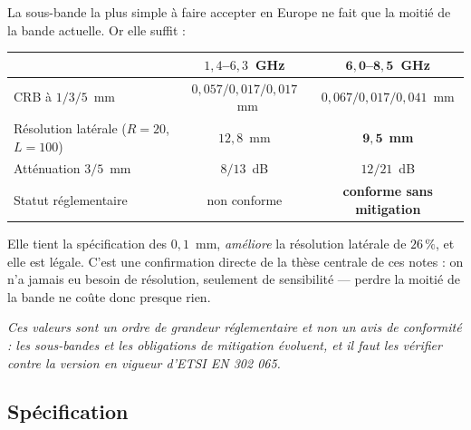 \documentclass[11pt,a4paper]{article}
\begin{document}
La sous-bande la plus simple à faire accepter en Europe ne fait que la moitié de
la bande actuelle. Or elle suffit :

\begin{table}[h]
\centering
\begin{tabular}{lcc}
\toprule
& $1{,}4$--$6{,}3$~GHz & $\mathbf{6{,}0}$--$\mathbf{8{,}5}$~\textbf{GHz} \\
\midrule
CRB à $1/3/5$~mm & $0{,}057 / 0{,}017 / 0{,}017$~mm
                 & $0{,}067 / 0{,}017 / 0{,}041$~mm \\
Résolution latérale ($R=20$, $L=100$) & $12{,}8$~mm
                                      & $\mathbf{9{,}5}$~\textbf{mm} \\
Atténuation $3/5$~mm & $8 / 13$~dB & $12 / 21$~dB \\
Statut réglementaire & non conforme & \textbf{conforme sans mitigation} \\
\bottomrule
\end{tabular}
\end{table}

Elle tient la spécification des $0{,}1$~mm, \emph{améliore} la résolution
latérale de $26\,\%$, et elle est légale. C'est une confirmation directe de la
thèse centrale de ces notes : on n'a jamais eu besoin de résolution, seulement
de sensibilité --- perdre la moitié de la bande ne coûte donc presque rien.

\emph{Ces valeurs sont un ordre de grandeur réglementaire et non un avis de
conformité : les sous-bandes et les obligations de mitigation évoluent, et il
faut les vérifier contre la version en vigueur d'ETSI EN 302 065.}

\subsection{Spécification}
\end{document}

